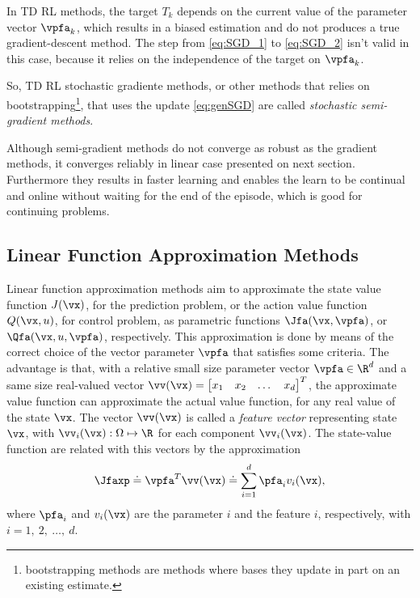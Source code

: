 In TD RL methods, the target $T_k$ depends on the current value of the parameter vector  $\vpfa_k$, which results in a biased estimation and do not produces a true gradient-descent method.
The step from  \eqref{eq:SGD_1} to \eqref{eq:SGD_2} isn't valid in this case, because it relies on the independence of the target on $\vpfa_k$.

So, TD RL stochastic gradiente methods, or other methods that relies on 
bootstrapping\footnote{bootstrapping methods are methods where bases they update in part on an existing estimate.}, that uses the update \eqref{eq:genSGD} are called \textit{stochastic semi-gradient methods}.


Although semi-gradient methods do not converge as robust as the gradient methods, it converges reliably in linear case presented on next section.
Furthermore they results in faster learning and enables the learn to be continual and online without waiting for the end of the episode, which is good for continuing problems.


\subsection{Linear Function Approximation Methods}%
\label{sub:linear_function_approximation_methods}

Linear function approximation methods aim to approximate the state value function $J(\vx)$, for the prediction problem, or the action value function  $Q(\vx,u)$, for control problem, as parametric functions $\Jfa(\vx,\vpfa)$, or  $\Qfa(\vx,u,\vpfa)$, respectively. This approximation is done by means of the correct choice of the vector parameter $\vpfa$ that satisfies some criteria. The advantage is that, with a relative small size parameter vector $\vpfa \in \R^d$ and a same size real-valued vector $\vv(\vx) = \begin{bmatrix} x_1 & x_2 & \dots & x_d \end{bmatrix}^T $, the approximate value function can approximate the actual value function, for any real value of the state $\vx$. The vector $\vv(\vx)$ is called a \textit{feature vector} representing state $\vx$, with  $\vv_i(\vx) : \Omega \mapsto \R$ for each component $\vv_i(\vx)$. The state-value function are related with this vectors by the approximation
\begin{equation}
  \Jfaxp \doteq \vpfa^T \vv(\vx) \doteq \sum_{i=1}^d \pfa_i v_i(\vx)
  \label{eq:state-value-fa},
\end{equation}
where $\pfa_i$ and $v_i(\vx)$ are the parameter $i$ and the feature $i$, respectively, with  $i = 1,\ 2,\ \dots,\ d$.

